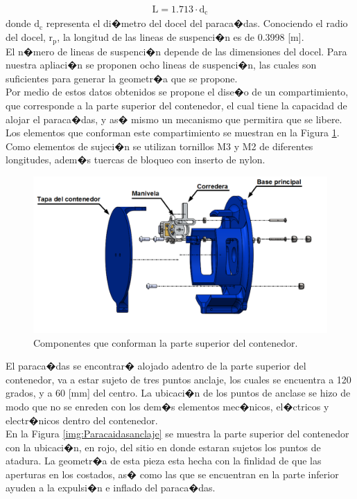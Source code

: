 \documentclass[10pt,a4paper]{book}
\begin{document}
\begin{align}
\label{eq:longitudparacaidas}
\text{L} = 1{.}713 \cdot \text{d}_{\text{c}} 
\end{align}
donde $\text{d}_{\text{c}}$ representa el di�metro del docel del paraca�das. Conociendo el radio del docel,  $\text{r}_{\text{p}}$, la longitud de las lineas de suspenci�n es de 0.3998 [m].\\
El n�mero de lineas de suspenci�n depende de las dimensiones del docel. Para nuestra apliaci�n se proponen ocho lineas de suspenci�n, las cuales son suficientes para generar la geometr�a que se propone.\\

Por medio de estos datos obtenidos se propone el dise�o de un compartimiento, que corresponde a la parte superior del contenedor, el cual tiene la capacidad de alojar el paraca�das, y as� mismo un mecanismo que permitira que se libere. Los elementos que conforman este compartimiento se muestran en la Figura \ref{img:Compartimientoparacaidas}. Como elementos de sujeci�n se utilizan tornillos M3 y M2 de diferentes longitudes, adem�s tuercas de bloqueo con inserto de nylon.

 \begin{figure}[H]
\begin{center}
\includegraphics[scale=0.40]{Imagenes/SistemaParacaidas.png}
\caption{Componentes que conforman la parte superior del contenedor. \label{img:Compartimientoparacaidas}}
\end{center}
\end{figure} 

El paraca�das se encontrar� alojado adentro de la parte superior del contenedor, va a estar sujeto de tres puntos anclaje, los cuales se encuentra a 120 grados, y a 60 [mm] del centro. La ubicaci�n de los puntos de anclase se hizo de modo que no se enreden con los dem�s elementos mec�nicos, el�ctricos y electr�nicos dentro del contenedor.\\
En la Figura \ref{img:Paracaidasanclaje} se muestra la parte superior del contenedor con la ubicaci�n, en rojo, del sitio en donde estaran sujetos los puntos de atadura. La geometr�a de esta pieza esta hecha con la finlidad de que las aperturas en los costados, as� como las que se encuentran en la parte inferior ayuden a la expulsi�n e inflado del paraca�das.
\end{document}
